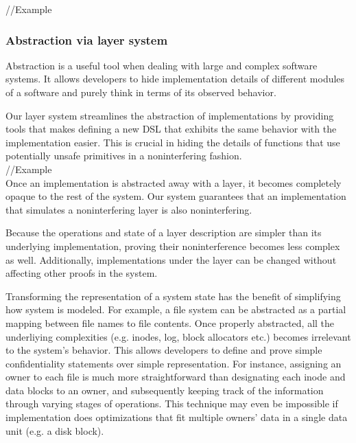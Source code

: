 \documentclass[onecolumn]{paper}
\begin{document}
//Example





\subsubsection*{Abstraction via layer system}
Abstraction is a useful tool when dealing with large and complex software systems.
It allows developers to hide implementation details of different modules of a software and purely think in terms of its observed behavior.

Our layer system streamlines the abstraction of implementations by providing tools that makes defining a new DSL that exhibits the same behavior with the implementation easier.
This is crucial in hiding the details of functions that use potentially unsafe primitives in a noninterfering fashion.\\

//Example\\

Once an implementation is abstracted away with a layer, it becomes completely opaque to the rest of the system. Our system guarantees that an implementation that simulates a noninterfering layer is also noninterfering.

Because the operations and state of a layer description are simpler than its underlying implementation, proving their noninterference becomes less complex as well. Additionally, implementations under the layer can be changed without affecting other proofs in the system.

Transforming the representation of a system state has the benefit of simplifying how system is modeled. For example, a file system can be abstracted as a partial mapping between file names to file contents. Once properly abstracted, all the underliying complexities (e.g. inodes, log, block allocators etc.) becomes irrelevant to the system's behavior. This allows developers to define and prove simple confidentiality statements over simple representation. For instance, assigning an owner to each file is much more straightforward than designating each inode and data blocks to an owner, and subsequently keeping track of the information through varying stages of operations. This technique may even be impossible if implementation does optimizations that fit multiple owners' data in a single data unit (e.g. a disk block).
\end{document}
